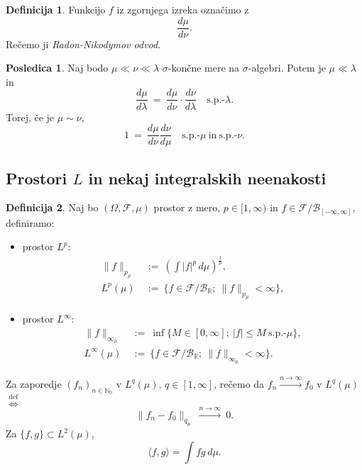 \documentclass[11pt]{article}
\newcommand{\R}{\mathbb{R}}
\newcommand{\N}{\mathbb{N}}
\newcommand{\F}{\mathcal{F}}
\newcommand{\B}{\mathscr{B}}
\newcommand{\diff}{\overset{\text{def}}{\iff}}
\newcommand{\set}[1]{\{#1\}}
\newcommand{\oklepaj}[1]{\left(#1\right)}
\newcommand{\1}{\mathbbm{1}}
\newcommand{\rr}{[-\infty,\infty]}
\theoremstyle{definition}
\newtheorem{definicija}{Definicija}[section]
\theoremstyle{definition}
\theoremstyle{definition}
\theoremstyle{definition}
\newtheorem*{posledica}{Posledica}
\begin{document}
\begin{definicija}

Funkcijo $f$ iz zgornjega izreka označimo z $$\frac{d\mu}{d\nu}.$$ Rečemo ji \textit{Radon-Nikodymov odvod}.

\end{definicija}
\vspace{0.5cm}

\begin{posledica}

Naj bodo $\mu \ll \nu \ll \lambda$ $\sigma$-končne mere na $\sigma$-algebri. Potem je $\mu \ll \lambda$ in 
$$\frac{d\mu}{d\lambda} ~=~ \frac{d\mu}{d\nu}\cdot\frac{d\nu}{d\lambda} \quad \text{s.p.-}\lambda.$$
Torej, če je $\mu \sim \nu$,
$$1 ~=~ \frac{d\mu}{d\nu}\frac{d\nu}{d\mu} \quad \text{s.p.-}\mu ~\text{in}~ \text{s.p.-}\nu.$$

\end{posledica}
\vspace{0.5cm}


\subsection{Prostori $L$ in nekaj integralskih neenakosti}
\vspace{0.5cm}

\begin{definicija}

Naj bo $(\Omega, \F, \mu)$ prostor z mero, $p \in [1,\infty)$ in $f \in \F/\B_{\rr}$, definiramo:
\begin{itemize}
\item prostor $L^p$:
\begin{align*}
\|f\|_{p_\mu} ~&:=~ \oklepaj{\int |f|^p\,d\mu}^\frac{1}{p}, \\
L^p(\mu) ~&:=~ \set{f \in \F/\B_\R;~\|f\|_{p_\mu}<\infty},
\end{align*}
\item prostor $L^\infty$:
\begin{align*}
\|f\|_{\infty_\mu} ~&:=~ \inf\set{M \in [0,\infty];~|f| \leq M ~\text{s.p.-}\mu}, \\
L^\infty(\mu) ~&:=~ \set{f \in \F/\B_\R;~\|f\|_{\infty_\mu}<\infty}.
\end{align*}
\end{itemize}
Za zaporedje $(f_n)_{n \in \N_0}$ v $L^q(\mu)$, $q \in [1,\infty]$, rečemo da $f_n \xrightarrow{n \rightarrow \infty} f_0$ v $L^q(\mu)$ $\diff$ 
$$\|f_n-f_0\|_{q_\mu} ~\xrightarrow{n \rightarrow \infty}~ 0.$$
Za $\set{f,g} \subset L^2(\mu)$,
$$\langle f,g \rangle = \int fg\,d\mu.$$

\end{definicija}
\vspace{0.5cm}
\end{document}
